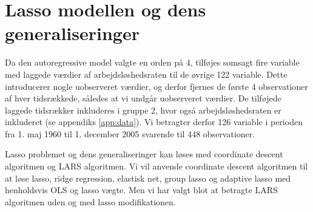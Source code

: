 \chapter{Lasso modellen og dens generaliseringer}
Da den autoregressive model valgte en orden på 4, tilføjes somsagt fire variable med laggede værdier af arbejdsløshedsraten til de øvrige 122 variable.
Dette introducerer nogle uobserveret værdier, og derfor fjernes de første 4 observationer af hver tidsrækkede, således at vi undgår uobserveret værdier.
De tilføjede laggede tidsrækker inkluderes i gruppe 2, hvor også arbejdsløshedsraten er inkluderet (se appendiks \ref{app:data}).
Vi betragter derfor 126 variable i perioden fra 1. maj 1960 til 1. december 2005 svarende til 448 observationer.

Lasso problemet og dens generaliseringer kan løses med coordinate descent algoritmen og LARS algoritmen.
Vi vil anvende coordinate descent algoritmen til at løse lasso, ridge regression, elastisk net, group lasso og adaptive lasso med henholdsvis OLS og lasso vægte.
Men vi har valgt blot at betragte LARS algoritmen uden og med lasso modifikationen.





%
